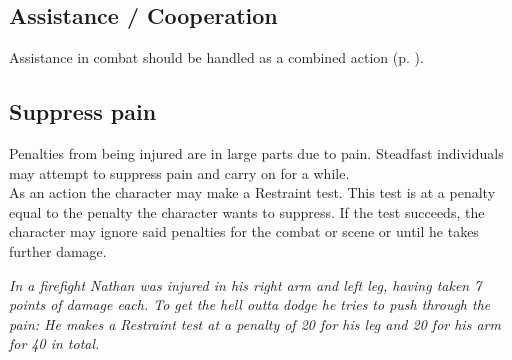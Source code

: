 \subsection*{Assistance / Cooperation}
Assistance in combat should be handled as a combined action (p. \pageref{combinedaction}).
\subsection*{Suppress pain}
Penalties from being injured are in large parts due to pain. Steadfast individuals may attempt to suppress pain and carry on for a while.\\
As an action the character may make a Restraint test. This test is at a penalty equal to the penalty the character wants to suppress. If the test succeeds, the character may ignore said penalties for the combat or scene or until he takes further damage.
\begin{exampleblock}
	\itshape
	In a firefight Nathan was injured in his right arm and left leg, having taken 7 points of damage each. To get the hell outta dodge he tries to push through the pain: He makes a \emph{Restraint} test at a penalty of 20 for his leg and 20 for his arm for 40 in total.
\end{exampleblock}